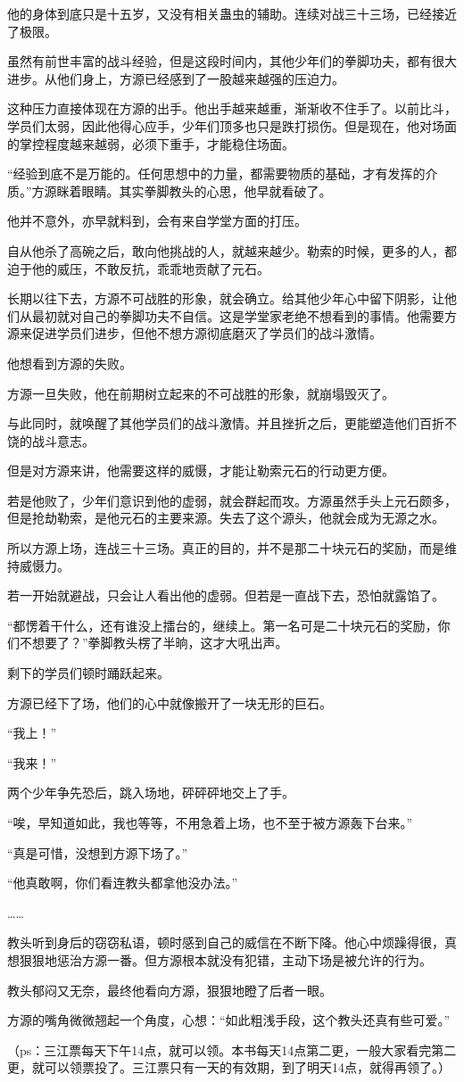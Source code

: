 \begin{this_body}
他的身体到底只是十五岁，又没有相关蛊虫的辅助。连续对战三十三场，已经接近了极限。

虽然有前世丰富的战斗经验，但是这段时间内，其他少年们的拳脚功夫，都有很大进步。从他们身上，方源已经感到了一股越来越强的压迫力。

这种压力直接体现在方源的出手。他出手越来越重，渐渐收不住手了。以前比斗，学员们太弱，因此他得心应手，少年们顶多也只是跌打损伤。但是现在，他对场面的掌控程度越来越弱，必须下重手，才能稳住场面。

“经验到底不是万能的。任何思想中的力量，都需要物质的基础，才有发挥的介质。”方源眯着眼睛。其实拳脚教头的心思，他早就看破了。

他并不意外，亦早就料到，会有来自学堂方面的打压。

自从他杀了高碗之后，敢向他挑战的人，就越来越少。勒索的时候，更多的人，都迫于他的威压，不敢反抗，乖乖地贡献了元石。

长期以往下去，方源不可战胜的形象，就会确立。给其他少年心中留下阴影，让他们从最初就对自己的拳脚功夫不自信。这是学堂家老绝不想看到的事情。他需要方源来促进学员们进步，但他不想方源彻底磨灭了学员们的战斗激情。

他想看到方源的失败。

方源一旦失败，他在前期树立起来的不可战胜的形象，就崩塌毁灭了。

与此同时，就唤醒了其他学员们的战斗激情。并且挫折之后，更能塑造他们百折不饶的战斗意志。

但是对方源来讲，他需要这样的威慑，才能让勒索元石的行动更方便。

若是他败了，少年们意识到他的虚弱，就会群起而攻。方源虽然手头上元石颇多，但是抢劫勒索，是他元石的主要来源。失去了这个源头，他就会成为无源之水。

所以方源上场，连战三十三场。真正的目的，并不是那二十块元石的奖励，而是维持威慑力。

若一开始就避战，只会让人看出他的虚弱。但若是一直战下去，恐怕就露馅了。

“都愣着干什么，还有谁没上擂台的，继续上。第一名可是二十块元石的奖励，你们不想要了？”拳脚教头楞了半晌，这才大吼出声。

剩下的学员们顿时踊跃起来。

方源已经下了场，他们的心中就像搬开了一块无形的巨石。

“我上！”

“我来！”

两个少年争先恐后，跳入场地，砰砰砰地交上了手。

“唉，早知道如此，我也等等，不用急着上场，也不至于被方源轰下台来。”

“真是可惜，没想到方源下场了。”

“他真敢啊，你们看连教头都拿他没办法。”

……

教头听到身后的窃窃私语，顿时感到自己的威信在不断下降。他心中烦躁得很，真想狠狠地惩治方源一番。但方源根本就没有犯错，主动下场是被允许的行为。

教头郁闷又无奈，最终他看向方源，狠狠地瞪了后者一眼。

方源的嘴角微微翘起一个角度，心想：“如此粗浅手段，这个教头还真有些可爱。”

（ps：三江票每天下午14点，就可以领。本书每天14点第二更，一般大家看完第二更，就可以领票投了。三江票只有一天的有效期，到了明天14点，就得再领了。）

\end{this_body}

